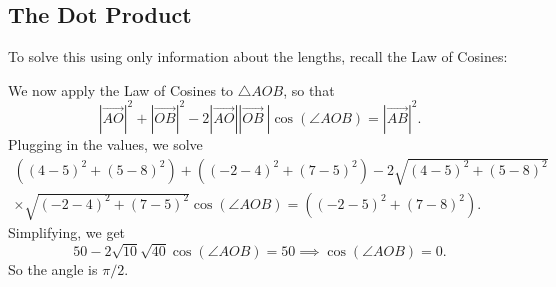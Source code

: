 \subsection{The Dot Product}
To solve this using only information about the lengths, recall the Law of Cosines:


We now apply the Law of Cosines to $\triangle AOB$, so that\[
	|\overrightarrow{AO}|^2  +|\overrightarrow{OB}|^2- 2 |\overrightarrow{AO}| |\overrightarrow{OB} \ |\cos(\angle AOB) = |\overrightarrow{AB}|^2.
\]
Plugging in the values, we solve 
\begin{align*}
		((4-5)^2 + (5-8)^2) + ((-2-4)^2+(7-5)^2) - 2 \sqrt{(4-5)^2 + (5-8)^2} \\ \times \sqrt{(-2-4)^2+(7-5)^2} \cos(\angle AOB) = ((-2-5)^2+(7-8)^2).
\end{align*}
Simplifying, we get\[
	50 - 2 \sqrt{10} \sqrt{40} \cos(\angle AOB) = 50 \implies \cos(\angle AOB) = 0.
\]
So the angle is $\pi/2$.

